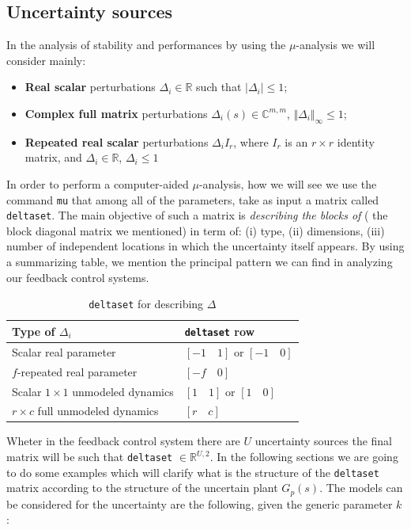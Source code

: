 \documentclass[a4paper, 12pt]{article}
\begin{document}
\subsection{Uncertainty sources}
In the analysis of stability and performances by using the $\mu$-analysis we will consider mainly:
\begin{itemize}
    \itemsep-0.2em
    \item \textbf{Real scalar} perturbations $\Delta_i\in\mathbb{R}$ such that $\vert \Delta_i \vert\le1$; 
    \item \textbf{Complex full matrix} perturbations $\Delta_i(s)\in\mathbb{C}^{m,m}$, $\Vert \Delta_i \Vert_\infty\le1$;
    \item \textbf{Repeated real scalar} perturbations $\Delta_i I_r$, where $I_r$ is an $r\times{r}$ identity matrix, and $\Delta_i\in\mathbb{R}$, $\Delta_i\le{1}$ 
\end{itemize}
In order to perform a computer-aided $\mu$-analysis, how we will see we use the command \texttt{mu} that among all of the parameters, take as input a matrix called \texttt{deltaset}. The main objective of such a matrix is \textit{describing the blocks of } ( the block diagonal matrix we mentioned) in term of: (i) type, (ii) dimensions, (iii) number of independent locations in which the uncertainty itself appears. By using a summarizing table, we mention the principal pattern we can find in analyzing our feedback control systems. 

\begin{table}[h!]
    \centering
    \begin{tabular}{p{7cm} p{5cm}}
        \toprule[1pt]
        \textbf{Type of $\Delta_i$}&\textbf{\texttt{deltaset} row}\\
        \midrule
        Scalar real parameter&$[-1\quad{1}]$ or $[-1\quad0]$\\
        \midrule
        $f$-repeated real parameter&$[-f\quad{0}]$\\
        \midrule
        Scalar $1\times1$ unmodeled dynamics&$[1\quad{1}]$ or $[1\quad0]$\\
        \midrule
        $r\times{c}$ full unmodeled dynamics&$[r\quad{c}]$\\        \bottomrule[1pt]
    \end{tabular}
    \caption{\texttt{deltaset} for describing $\Delta$}
    \label{tab:deltaset}
\end{table}
\noindent
Wheter in the feedback control system there are $U$ uncertainty sources the final matrix will be such that \texttt{deltaset} $\in\mathbb{R}^{U,2}$.
In the following sections we are going to do some examples which will clarify what is the structure of the \texttt{deltaset} matrix according to the structure of the uncertain plant $G_p(s)$.
The models can be considered for the uncertainty are the following, given the generic parameter $k$: 
\end{document}

